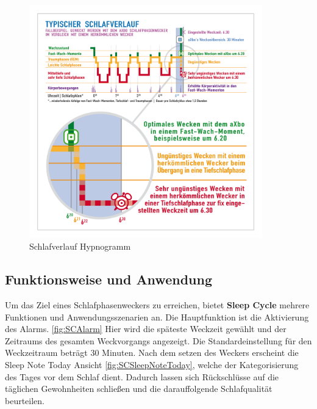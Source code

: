 \begin{figure}[h]
\centering
\includegraphics[width=0.9\textwidth]{images/aXbo_Schlafverlauf_Hypnogramm_DE.png}
\caption{Schlafverlauf Hypnogramm \cite{fig:Hypnogramm}}
\label{fig:Hypnogramm}
\end{figure}


\subsection{Funktionsweise und Anwendung}
\label{ch:Apps:sec:Sleepcycle:subsec:FuA}

Um das Ziel eines Schlafphasenweckers zu erreichen, bietet \textbf{Sleep Cycle} mehrere Funktionen und Anwendungsszenarien an.
Die Hauptfunktion ist die Aktivierung des Alarms. \ref{fig:SCAlarm}
Hier wird die späteste Weckzeit gewählt und der Zeitraums des gesamten Weckvorgangs angezeigt.
Die Standardeinstellung für den Weckzeitraum beträgt 30 Minuten.
Nach dem setzen des Weckers erscheint die Sleep Note Today Ansicht \ref{fig:SCSleepNoteToday}, welche der Kategorisierung des Tages vor dem Schlaf dient. Dadurch lassen sich Rückschlüsse auf die täglichen Gewohnheiten schließen und die darauffolgende Schlafqualität beurteilen.


